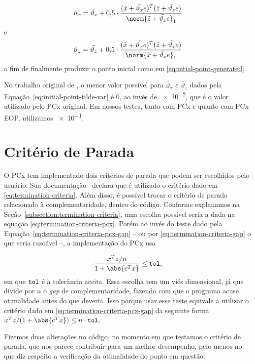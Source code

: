\begin{equation}
	\label{eq:initial-point-var-x}
\vartheta_{x} = \tilde{\vartheta_x} + \num{0.5}\cdot\dfrac{(\xtil+\tilde{\vartheta_x} e)^{T}(\ztil+\tilde{\vartheta_z} e)}{\norm{\ztil+\tilde{\vartheta_z} e}_{1}} 
\end{equation}
e
\begin{equation}
	\label{eq:initial-point-var-z}
\vartheta_{z} = \tilde{\vartheta_z} + \num{0.5}\cdot\dfrac{(\xtil+\tilde{\vartheta_x} e)^{T}(\ztil+\tilde{\vartheta_z} e)}{\norm{\xtil+\tilde{\vartheta_x} e}_{1}} 
\end{equation}
a fim de finalmente produzir o ponto inicial como em \eqref{eq:intial-point-generated}.

No trabalho original de \textcite{Mehrotra:1992wr}, o menor valor possível para  $\tilde{\vartheta_x}$ e $\tilde{\vartheta_z}$ dados pela Equação~\eqref{eq:initial-point-tilde-var} é $\num{0}$, ao invés de \num{e-2}, 	que é o valor utilizado pelo PCx original. Em nossos testes, tanto com PCx-r quanto com PCx-EOP, utilizamos \num{e-1}.  


\section{Critério de Parada}


O PCx tem implementado dois critérios de parada que podem ser escolhidos pelo usuário. Sua   documentação~\cite{Czyzyk:1998vw} declara que é utilizado o critério dado em \eqref{eq:termination-criteria}.   Além disso, é possível trocar o critério de parada relacionado à complementaridade, dentro do código. Conforme explanamos na Seção~\ref{subsection:termination-criteria}, uma escolha possível seria a dada na equação \eqref{eq:termination-criteria-pcx}. Porém ao invés do teste dado pela Equação~\eqref{eq:termination-criteria-pcx-gap} -- ou por \eqref{eq:termination-criteria-gap} o que seria razoável --, a implementação do PCx usa

\[
\dfrac{x^{T}z/n}{1 + \abs{c^Tx}}\leq
	\tol,
\]
em que $\mathtt{tol}$ é a tolerância aceita. Essa escolha tem um viés dimensional, já que divide por $n$ o \emph{gap} de complementaridade, fazendo com que o programa acuse otimalidade  antes do que deveria. Isso porque usar esse teste equivale a utilizar  o critério dado em \eqref{eq:termination-criteria-pcx-gap} da seguinte forma $x^{T}z/(1 + \abs{c^Tx})\leq
	n\cdot \tol$. 


Fizemos duas  alterações no código, no momento em que testamos o critério de parada, que nos parece  contribuir para um melhor desempenho, pelo menos  no que diz respeito a verificação da otimalidade do ponto em questão. 

